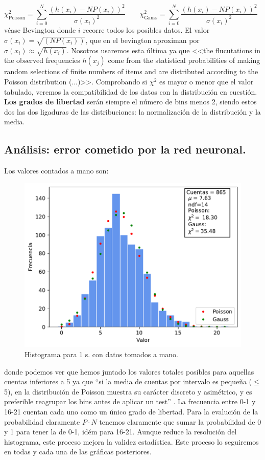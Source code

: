 \documentclass[11pt]{article}
\begin{document}
\begin{equation}
	\chi^2_{\text{Poisson}} = \sum_{i=0}^N \frac{(h(x_i)-NP(x_i))^2}{\sigma(x_i)^2} \qquad 
	\chi^2_{\text{Gauss}}= \sum_{i=0}^N \frac{(h(x_i)-NP(x_i))^2}{\sigma(x_i)^2} \qquad 
\end{equation}
véase Bevington \cite{Bevington:1305448} donde $i$ recorre todos los posibles datos. El valor $\sigma(x_i)=\sqrt{(NP(x_i))}$, que en el bevington aproximan por $\sigma(x_i)\approx \sqrt{h(x_i)}$. Nosotros usaremos esta última ya que <<the flucutations in the observed frequencies $h(x_j)$ come from the statistical probabilities of making random selections of finite numbers of items and are distributed according to the Poisson distribution (...)>>. Comprobando si $\chi^2$ es mayor o menor que el valor tabulado, veremos la compatibilidad de los datos con la distribución en cuestión. \textbf{Los grados de libertad} serán siempre el número de bins menos 2, siendo estos dos las dos ligaduras de las distribuciones: la normalización de la distribución y la media.

\subsection{Análisis: error cometido por la red neuronal.}

Los valores contados a mano son: 



\begin{figure}[h!] \centering
	\caption{Histograma para 1 s. con datos tomados a mano.}
	\includegraphics[width=0.5\linewidth]{../Graficas/Histo_1manuals.pdf}
\end{figure}
donde podemos ver que hemos juntado los valores totales posibles para aquellas cuentas inferiores a 5 ya que ``si la media de cuentas por intervalo es pequeña ($\leq$5), en la distribución de Poisson muestra su carácter discreto y asimétrico, y es preferible reagrupar los bins antes de aplicar un test'' \cite{P2}. La frecuencia entre 0-1 y 16-21 cuentan cada uno como un único grado de libertad. Para la evalución de la probabilidad claramente $P\cdot N$ tenemos claramente que sumar la probabilidad de 0 y 1 para tener la de 0-1, idém para 16-21. Aunque reduce la resolución del histograma, este proceso mejora la validez estadística. Este proceso lo seguiremos en todas y cada una de las gráficas posteriores. 
\end{document}
